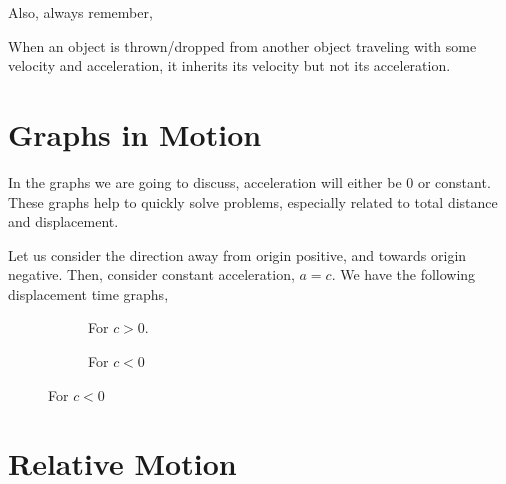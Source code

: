 Also, always remember,

\begin{moral}
    When an object is thrown/dropped from another object traveling with some velocity and
    acceleration, it inherits its velocity but not its acceleration.
\end{moral}


\section{Graphs in Motion}

In the graphs we are going to discuss, acceleration will either be \(0\) or constant.
These graphs help to quickly solve problems, especially related to total distance and 
displacement. 

Let us consider the direction away from origin positive, and towards origin negative.
Then, consider constant acceleration, \(a = c\). We have the following displacement time
graphs,

\begin{figure}[H]
    \centering
    \begin{subfigure}{0.5\textwidth}
        \centering
        \caption{For \(c > 0\). }
    \end{subfigure}%
    \begin{subfigure}{0.5\textwidth}
        \centering
        \caption{For \(c < 0\)}
    \end{subfigure}%
\end{figure}

\section{Relative Motion}

